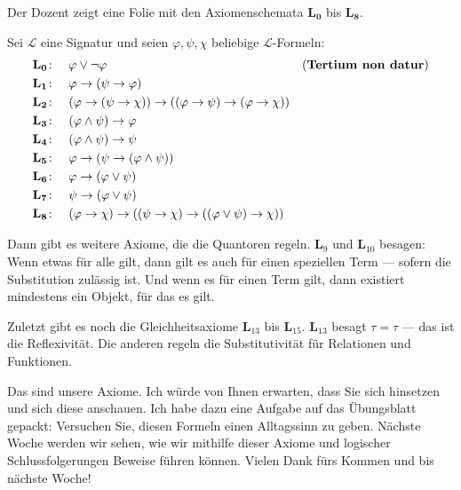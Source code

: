 \begin{meta-note}
Der Dozent zeigt eine Folie mit den Axiomenschemata $\mathbf{L_0}$ bis $\mathbf{L_8}$.
\end{meta-note}

\begin{math-stroke}
Sei $\mathcal{L}$ eine Signatur und seien $\varphi, \psi, \chi$ beliebige $\mathcal{L}$-Formeln:
\begin{align}
    \mathbf{L_0}\colon &\quad \varphi \vee \neg \varphi && \text{(\textbf{Tertium non datur})} \nonumber \\
    \mathbf{L_1}\colon &\quad \varphi \rightarrow (\psi \rightarrow \varphi) \nonumber \\
    \mathbf{L_2}\colon &\quad (\varphi \rightarrow (\psi \rightarrow \chi)) \rightarrow ((\varphi \rightarrow \psi) \rightarrow (\varphi \rightarrow \chi)) \nonumber \\
    \mathbf{L_3}\colon &\quad (\varphi \wedge \psi) \rightarrow \varphi \nonumber \\
    \mathbf{L_4}\colon &\quad (\varphi \wedge \psi) \rightarrow \psi \nonumber \\
    \mathbf{L_5}\colon &\quad \varphi \rightarrow (\psi \rightarrow (\varphi \wedge \psi)) \nonumber \\
    \mathbf{L_6}\colon &\quad \varphi \rightarrow (\varphi \vee \psi) \nonumber \\
    \mathbf{L_7}\colon &\quad \psi \rightarrow (\varphi \vee \psi) \nonumber \\
    \mathbf{L_8}\colon &\quad (\varphi \rightarrow \chi) \rightarrow ((\psi \rightarrow \chi) \rightarrow ((\varphi \vee \psi) \rightarrow \chi)) \nonumber
\end{align}
\end{math-stroke}

\begin{spoken-clean}[01:25:27 - 01:26:27]
Dann gibt es weitere Axiome, die die Quantoren regeln. \textbf{L$_9$} und \textbf{L$_{10}$} besagen: Wenn etwas für alle gilt, dann gilt es auch für einen speziellen Term --- sofern die Substitution zulässig ist. Und wenn es für einen Term gilt, dann existiert mindestens ein Objekt, für das es gilt.

Zuletzt gibt es noch die Gleichheitsaxiome \textbf{L$_{13}$} bis \textbf{L$_{15}$}. \textbf{L$_{13}$} besagt $\tau = \tau$ --- das ist die Reflexivität. Die anderen regeln die Substitutivität für Relationen und Funktionen.

Das sind unsere Axiome. Ich würde von Ihnen erwarten, dass Sie sich hinsetzen und sich diese anschauen. Ich habe dazu eine Aufgabe auf das Übungsblatt gepackt: Versuchen Sie, diesen Formeln einen Alltagssinn zu geben. Nächste Woche werden wir sehen, wie wir mithilfe dieser Axiome und logischer Schlussfolgerungen Beweise führen können. Vielen Dank fürs Kommen und bis nächste Woche!
\end{spoken-clean}

